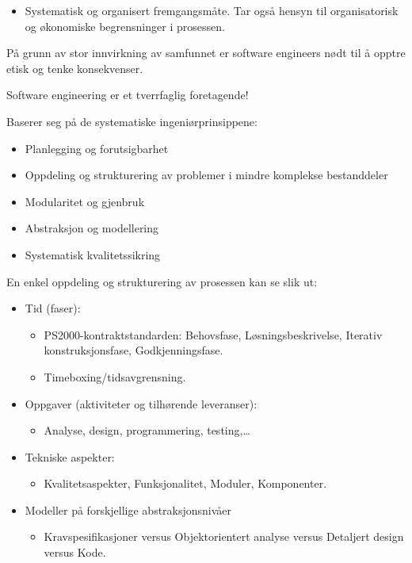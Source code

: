 \documentclass[11pt]{article}
\begin{document}
\begin{itemize}
\item Systematisk og organisert fremgangsmåte. 
     Tar også hensyn til organisatorisk og økonomiske begrensninger i prosessen.
\end{itemize}
  
   På grunn av stor innvirkning av samfunnet er software engineers nødt til å opptre etisk og tenke konsekvenser. 

   Software engineering er et tverrfaglig foretagende!

   Baserer seg på de systematiske ingeniørprinsippene:
\begin{itemize}
\item Planlegging og forutsigbarhet
\item Oppdeling og strukturering av problemer i mindre komplekse bestanddeler
\item Modularitet og gjenbruk
\item Abstraksjon og modellering
\item Systematisk kvalitetssikring
\end{itemize}

   En enkel oppdeling og strukturering av prosessen kan se slik ut:
\begin{itemize}
\item Tid (faser):

\begin{itemize}
\item PS2000-kontraktstandarden: Behovsfase, Løsningsbeskrivelse, Iterativ konstruksjonsfase, Godkjenningsfase.
\item Timeboxing/tidsavgrensning.
\end{itemize}

\item Oppgaver (aktiviteter og tilhørende leveranser):

\begin{itemize}
\item Analyse, design, programmering, testing,\ldots{}
\end{itemize}

\item Tekniske aspekter:

\begin{itemize}
\item Kvalitetsaspekter, Funksjonalitet, Moduler, Komponenter.
\end{itemize}

\item Modeller på forskjellige abstraksjonsnivåer

\begin{itemize}
\item Kravspesifikasjoner versus Objektorientert analyse versus Detaljert design versus Kode.
\end{itemize}

\end{itemize}
\end{document}
